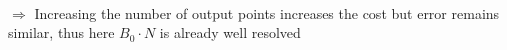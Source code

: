 \documentclass[aspectratio=169]{beamer}
\newcommand{\textc}[1]{\textcolor{iagcolor}{#1}}
\begin{document}
\begin{frame}
{  }\\
  \textc{$\Rightarrow$ Increasing the number of output points increases the cost but error remains similar, thus here $B_0\cdot N$ is already well resolved}\\
 

\end{frame}
\end{document}
